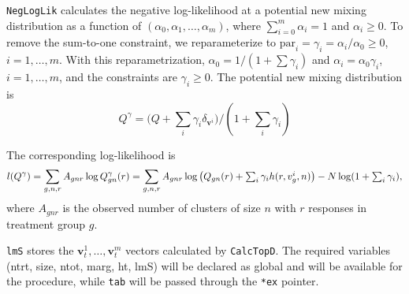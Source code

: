 \documentclass[reqno]{amsart}
\newcommand{\bv}{\mathbf{v}}
\providecommand{\tsum}{\textstyle\sum}
\begin{document}
\texttt{NegLogLik} calculates the negative log-likelihood at a potential 
new mixing distribution as a function of $(\alpha_0,\alpha_1,\ldots,\alpha_m)$, where
$\sum_{i=0}^m\alpha_i=1$ and $\alpha_i\geq 0$. To remove the sum-to-one constraint, 
we reparameterize to $\text{par}_i=\gamma_i=\alpha_{i}/\alpha_{0}\geq 0$, $i=1,\ldots,m$.  
With this reparametrization, $\alpha_0=1/(1+\sum\gamma_i)$ and $\alpha_i=\alpha_0\gamma_i$, $i=1,\ldots,m$,
and the constraints are $\gamma_i\geq 0$. The potential new mixing distribution
is 
\begin{equation*}
 Q^\gamma = \big(Q + \tsum_i\gamma_i\delta_{\bv^i}\big)/(1+\tsum_i\gamma_i)
\end{equation*}

The corresponding log-likelihood is
\begin{equation}\label{E:newloglik}
l(Q^\gamma) =
\sum_{g,n,r} A_{gnr}\log Q^\gamma_{gn}(r) \\=
\sum_{g,n,r} A_{gnr}\log\big(Q_{gn}(r)+\tsum_i\gamma_ih(r,v^i_g,n)\big) 
  - N\log(1+\tsum_i\gamma_i) ,
\end{equation}
where $A_{gnr}$ is the observed number of clusters of size $n$ with $r$ responses
in treatment group $g$.


\texttt{lmS} stores the $\bv^1_t, \ldots, \bv^m_t$ vectors calculated by \texttt{CalcTopD}.
The required variables (ntrt, size, ntot, marg, ht, lmS) will be declared as global and will be available
for the procedure, while \texttt{tab} will be passed through the \texttt{*ex} pointer.
\end{document}
